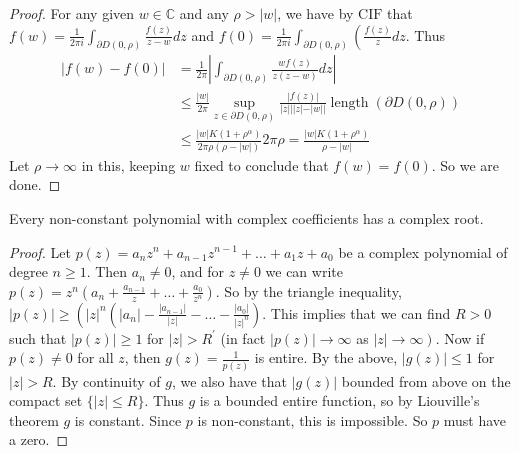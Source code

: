 \documentclass[a4paper]{scrartcl}
\begin{document}
\begin{proof}
     For any given $w \in \mathbb{C}$ and any $\rho>|w|$, we have by $\mathrm{CIF}$ that $f(w)=\frac{1}{2 \pi i} \int_{\partial D(0, \rho)} \frac{f(z)}{z-w} d z$ and $f(0)=\frac{1}{2 \pi i} \int_{\partial D(0, \rho)}\left(\frac{f(z)}{z} d z\right.$. Thus
     $$
     \begin{aligned}
     |f(w)-f(0)| &=\frac{1}{2 \pi}\left|\int_{\partial D(0, \rho)} \frac{w f(z)}{z(z-w)} d z\right| \\
     & \leq \frac{|w|}{2 \pi} \sup _{z \in \partial D(0, \rho)} \frac{|f(z)|}{|z||| z|-| w||} \operatorname{length}(\partial D(0, \rho)) \\
     & \leq \frac{|w| K\left(1+\rho^{\alpha}\right)}{2 \pi \rho(\rho-|w|)} 2 \pi \rho=\frac{|w| K\left(1+\rho^{\alpha}\right)}{\rho-|w|}
     \end{aligned}
     $$
     Let $\rho \rightarrow \infty$ in this, keeping $w$ fixed to conclude that $f(w)=f(0)$. So we are done.
\end{proof}
\begin{theorem}
      Every non-constant polynomial with complex coefficients has a complex root.
\end{theorem}
\begin{proof}
     Let $p(z)=a_{n} z^{n}+a_{n-1} z^{n-1}+\ldots+a_{1} z+a_{0}$ be a complex polynomial of degree $n \geq 1$. Then $a_{n} \neq 0$, and for $z \neq 0$ we can write $p(z)=z^{n}\left(a_{n}+\frac{a_{n-1}}{z}+\ldots+\frac{a_{0}}{z^{n}}\right)$. So by the triangle inequality,
     $|p(z)| \geq\left(|z|^{n}\left(\left|a_{n}\right|-\frac{\left|a_{n-1}\right|}{|z|}-\ldots-\frac{\left|a_{0}\right|}{|z|^{n}}\right)\right.$. This implies that we can find
     $R>0$ such that $|p(z)| \geq 1$ for $|z|>R^{\prime}$ (in fact $|p(z)| \rightarrow \infty$ as $\left.|z| \rightarrow \infty\right)$.
     Now if $p(z) \neq 0$ for all $z$, then $g(z)=\frac{1}{p(z)}$ is entire. By the above, $|g(z)| \leq 1$ for $|z|>R$. By continuity of $g$, we also have that $|g(z)|$ bounded from above on the compact set $\{|z| \leq R\}$. Thus $g$ is a bounded entire function, so by Liouville's theorem $g$ is constant. Since $p$ is non-constant, this is impossible. So $p$ must have a zero.
\end{proof}
\begin{theorem}
      
\end{theorem}
\end{document}
